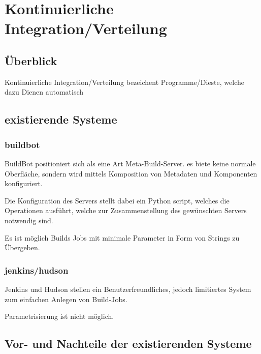 \section{Kontinuierliche Integration/Verteilung}

\subsection{Überblick}

Kontinuierliche Integration/Verteilung bezeichent Programme/Dieste,
welche dazu Dienen automatisch 

\subsection{existierende Systeme}

\subsubsection{buildbot}

BuildBot positioniert sich als eine Art Meta-Build-Server.
es biete keine normale Oberfläche, sondern wird mittels
Komposition von Metadaten und Komponenten konfiguriert.

Die Konfiguration des Servers stellt dabei ein Python script,
welches die Operationen ausführt, welche zur Zusammenstellung des gewünschten Servers notwendig sind.

Es ist möglich Builds Jobs mit minimale Parameter in Form von Strings zu Übergeben.

\subsubsection{jenkins/hudson}

Jenkins und Hudson stellen ein Benutzerfreundliches,
jedoch limitiertes System zum einfachen Anlegen von Build-Jobs.

Parametrisierung ist nicht möglich.

\subsection{Vor- und Nachteile der existierenden Systeme}
